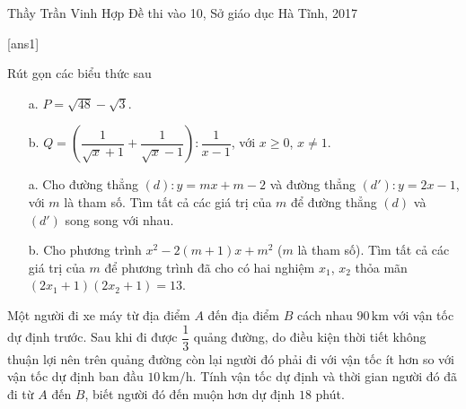 \begin{name}
{Thầy  Trần Vinh Hợp}
{Đề thi vào 10, Sở giáo dục Hà Tĩnh, 2017}
\end{name}
\setcounter{ex}{0}
[ans1]
\begin{ex}%
    Rút gọn các biểu thức sau
    \begin{enumerate}
    	\item[a.] $P=\sqrt{48}-\sqrt{3}$.
    	\item[b.] $Q=\left(\dfrac{1}{\sqrt{x}+1}+\dfrac{1}{\sqrt{x}-1}\right):\dfrac{1}{x-1}$, với $x\geq 0$, $x\neq 1$.
    \end{enumerate}
\end{ex}

\begin{ex}%
    \begin{enumerate}
   	\item[a.] Cho đường thẳng $(d): y=mx+m-2$ và đường thẳng $(d'): y=2x-1$, với $m$ là tham số. Tìm tất cả các giá trị của $m$ để đường thẳng $(d)$ và $(d')$ song song với nhau.
   	\item[b.] Cho phương trình $x^2-2(m+1)x+m^2$ ($m$ là tham số). Tìm tất cả các giá trị của $m$ để phương trình đã cho có hai nghiệm $x_1$, $x_2$ thỏa mãn $\left(2x_1+1\right)\left(2x_2+1\right)=13$. 
   \end{enumerate}
\end{ex}

\begin{ex}\newline
   Một người đi xe máy từ địa điểm $A$ đến địa điểm $B$ cách nhau $90\mathrm{\,km}$ với vận tốc dự định trước. Sau khi đi được $\dfrac{1}{3}$ quảng đường, do điều kiện thời tiết không thuận lợi nên trên quảng đường còn lại người đó phải đi với vận tốc ít hơn so với vận tốc dự định ban đầu $10\mathrm{\,km/h}$. Tính vận tốc dự định và thời gian người đó đã đi từ $A$ đến $B$, biết người đó đến muộn hơn dự định $18$ phút.
\end{ex}

